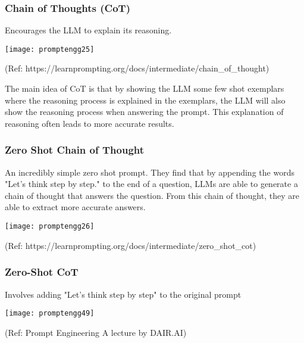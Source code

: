\begin{frame}[fragile]\frametitle{Chain of Thoughts (CoT)}

Encourages the LLM to explain its reasoning. 

\begin{center}
\texttt{[image: promptengg25]}

{\tiny (Ref: https://learnprompting.org/docs/intermediate/chain\_of\_thought)}

\end{center}		

The main idea of CoT is that by showing the LLM some few shot exemplars where the reasoning process is explained in the exemplars, the LLM will also show the reasoning process when answering the prompt. This explanation of reasoning often leads to more accurate results.

\end{frame}

\begin{frame}[fragile]\frametitle{Zero Shot Chain of Thought}

An incredibly simple zero shot prompt. They find that by appending the words "Let's think step by step." to the end of a question, LLMs are able to generate a chain of thought that answers the question. From this chain of thought, they are able to extract more accurate answers.

\begin{center}
\texttt{[image: promptengg26]}

{\tiny (Ref: https://learnprompting.org/docs/intermediate/zero\_shot\_cot)}

\end{center}		

\end{frame}

\begin{frame}[fragile]\frametitle{Zero-Shot CoT}

 Involves adding "Let's think step by step" to the original 
prompt


\begin{center}
\texttt{[image: promptengg49]}

{\tiny (Ref: Prompt Engineering A lecture by DAIR.AI)}

\end{center}	

\end{frame}

